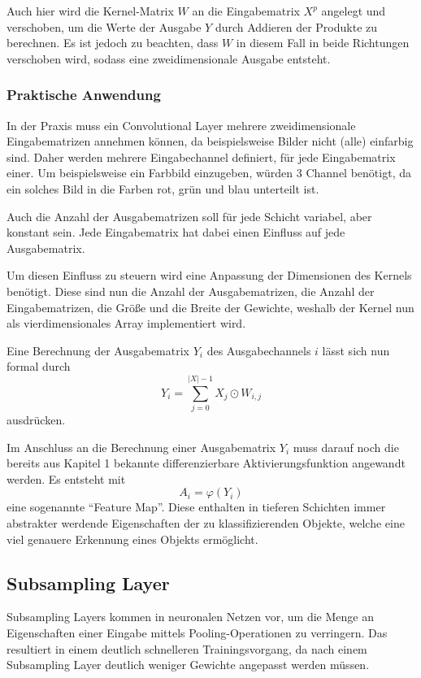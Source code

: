 \documentclass[12pt,a4]{article}
\begin{document}
Auch hier wird die Kernel-Matrix $W$ an die Eingabematrix $X^p$ angelegt und verschoben, um die Werte der Ausgabe $Y$ durch Addieren der Produkte zu berechnen. Es ist jedoch zu beachten, dass $W$ in diesem Fall in beide Richtungen verschoben wird, sodass eine zweidimensionale Ausgabe entsteht.

\subsubsection{Praktische Anwendung}
In der Praxis muss ein Convolutional Layer mehrere zweidimensionale Eingabematrizen annehmen können, da beispielsweise Bilder nicht (alle) einfarbig sind. Daher werden mehrere Eingabechannel definiert, für jede Eingabematrix einer. Um beispielsweise ein Farbbild einzugeben, würden 3 Channel benötigt, da ein solches Bild in die Farben rot, grün und blau unterteilt ist.

Auch die Anzahl der Ausgabematrizen soll für jede Schicht variabel, aber konstant sein. Jede Eingabematrix hat dabei einen Einfluss auf jede Ausgabematrix.

Um diesen Einfluss zu steuern wird eine Anpassung der Dimensionen des Kernels benötigt. Diese sind nun die Anzahl der Ausgabematrizen, die Anzahl der Eingabematrizen, die Größe und die Breite der Gewichte, weshalb der Kernel nun als vierdimensionales Array implementiert wird.

Eine Berechnung der Ausgabematrix $Y_i$ des Ausgabechannels $i$ lässt sich nun formal durch
\begin{equation}
Y_i = \sum\limits_{j=0}^{|X| - 1} X_j \odot W_{i, j}
\end{equation}
ausdrücken. 

Im Anschluss an die Berechnung einer Ausgabematrix $Y_i$ muss darauf noch die bereits aus Kapitel 1 bekannte differenzierbare Aktivierungsfunktion angewandt werden. Es entsteht mit 
\[
A_i = \varphi (Y_i)
\]
eine sogenannte \enquote{Feature Map}. Diese enthalten in tieferen Schichten immer abstrakter werdende Eigenschaften der zu klassifizierenden Objekte, welche eine viel genauere Erkennung eines Objekts ermöglicht.

\subsection{Subsampling Layer}
Subsampling Layers kommen in neuronalen Netzen vor, um die Menge an Eigenschaften einer Eingabe mittels Pooling-Operationen zu verringern. Das resultiert in einem deutlich schnelleren Trainingsvorgang, da nach einem Subsampling Layer deutlich weniger Gewichte angepasst werden müssen.
\end{document}
